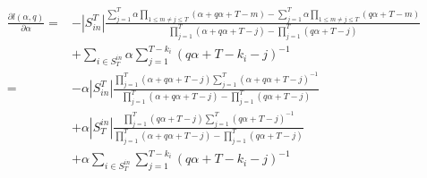 \documentclass[a4paper, 12pt]{article}
\newcommand{\sint}{|S_{in}^T|}
\begin{document}
\begin{align} \label{eq:7}
    \frac{\partial l(\alpha, q)}{\partial \alpha} =& -\sint \frac{\sum_{j = 1}^{T} \alpha \prod_{1 \leq m \neq j \leq T} (\alpha + q\alpha + T - m) - \sum_{j = 1}^{T} \alpha \prod_{1 \leq m \neq j \leq T} (q\alpha + T - m)}{\prod_{j = 1}^{T} (\alpha + q\alpha + T - j) - \prod_{j=1}^T (q\alpha + T - j)}\nonumber \\
    &+ \sum_{i \in S_T^{in}} \alpha \sum_{j = 1}^{T - k_i} (q\alpha + T - k_i - j)^{-1} \nonumber \\
    =& -\alpha\sint \frac{ \prod_{j = 1}^{T} (\alpha + q\alpha + T - j) \sum_{j = 1}^{T} (\alpha + q\alpha + T - j)^{-1} }{\prod_{j = 1}^{T} (\alpha + q\alpha + T - j) - \prod_{j=1}^T (q\alpha + T - j)} \nonumber \\
    &+ \alpha|S_T^{in}| \frac{\prod_{j = 1}^{T} (q\alpha + T - j) \sum_{j = 1}^{T} (q\alpha + T - j)^{-1}  }{ \prod_{j = 1}^{T} (\alpha + q\alpha + T - j) - \prod_{j=1}^T (q\alpha + T - j)} \nonumber \\
    &+ \alpha \sum_{i \in S_T^{in}} \sum_{j = 1}^{T - k_i} (q\alpha + T - k_i - j)^{-1} \nonumber \\
\end{align}
\end{document}
